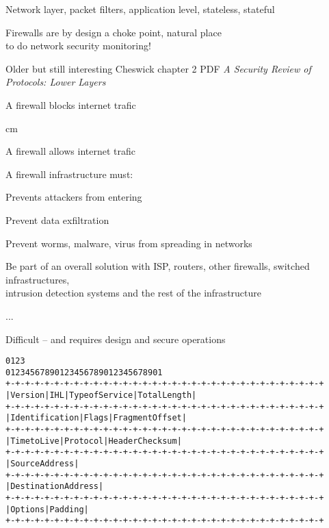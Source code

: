 \documentclass[Screen16to9,17pt]{foils}
\begin{document}
\begin{list2}
\item Network layer, packet filters, application level, stateless, stateful
\item Firewalls are by design a choke point, natural place \\
to do network security monitoring!
\item Older but still interesting Cheswick chapter 2 PDF
\emph{A Security Review of Protocols:
Lower Layers}\\
\end{list2}








\centerline{\hlkbig A firewall {\color{security6blue}blocks}
  internet trafic}

 cm
\pause

\centerline{\hlkbig A firewall {\color{red}allows}
  internet trafic}


\begin{list1}
\item A firewall infrastructure must:
\begin{list2}
\item Prevents attackers from entering
\item Prevent data exfiltration
\item Prevent worms, malware, virus from spreading in networks
\item Be part of an overall solution with ISP, routers, other firewalls, switched infrastructures,\\
  intrusion detection systems and the rest of the infrastructure
\item ...
\end{list2}
\end{list1}

\vskip 5mm
\centerline{\Large Difficult -- and requires design and secure operations}





\begin{alltt}\footnotesize
0                   1                   2                   3
0 1 2 3 4 5 6 7 8 9 0 1 2 3 4 5 6 7 8 9 0 1 2 3 4 5 6 7 8 9 0 1
+-+-+-+-+-+-+-+-+-+-+-+-+-+-+-+-+-+-+-+-+-+-+-+-+-+-+-+-+-+-+-+-+
|Version|  IHL  |Type of Service|          Total Length         |
+-+-+-+-+-+-+-+-+-+-+-+-+-+-+-+-+-+-+-+-+-+-+-+-+-+-+-+-+-+-+-+-+
|         Identification        |Flags|      Fragment Offset    |
+-+-+-+-+-+-+-+-+-+-+-+-+-+-+-+-+-+-+-+-+-+-+-+-+-+-+-+-+-+-+-+-+
|  Time to Live |    Protocol   |         Header Checksum       |
+-+-+-+-+-+-+-+-+-+-+-+-+-+-+-+-+-+-+-+-+-+-+-+-+-+-+-+-+-+-+-+-+
|                       Source Address                          |
+-+-+-+-+-+-+-+-+-+-+-+-+-+-+-+-+-+-+-+-+-+-+-+-+-+-+-+-+-+-+-+-+
|                    Destination Address                        |
+-+-+-+-+-+-+-+-+-+-+-+-+-+-+-+-+-+-+-+-+-+-+-+-+-+-+-+-+-+-+-+-+
|                    Options                    |    Padding    |
+-+-+-+-+-+-+-+-+-+-+-+-+-+-+-+-+-+-+-+-+-+-+-+-+-+-+-+-+-+-+-+-+
\end{alltt}
\end{document}

